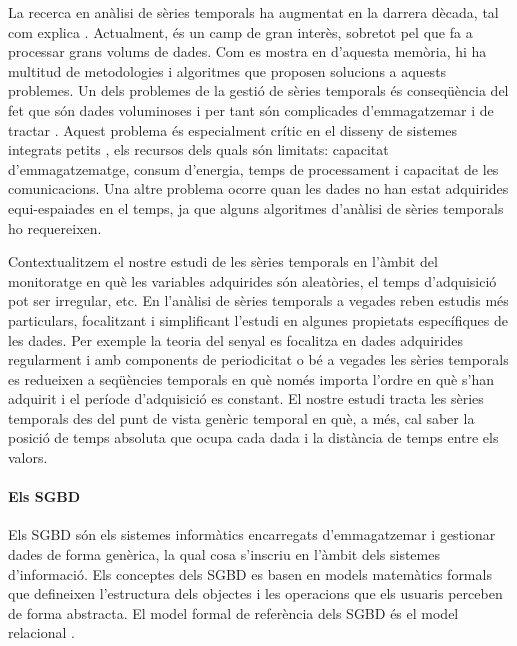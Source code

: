 La recerca en anàlisi de sèries temporals ha augmentat en la darrera
dècada, tal com explica \textcite{fu11}. Actualment, és un camp de
gran interès, sobretot pel que fa a processar grans volums de dades.
Com es mostra en  d'aquesta memòria, hi ha multitud
de metodologies i algoritmes que proposen solucions a aquests
problemes. Un dels problemes de la gestió de sèries temporals és
conseqüència del fet que són dades voluminoses i per tant són
complicades d'emmagatzemar i de tractar \cite{fu11,keogh08:isax}.
Aquest problema és especialment crític en el disseny de sistemes
integrats petits \cite{yaogehrke02}, els recursos dels quals són
limitats: capacitat d'emmagatzematge, consum d'energia, temps de
processament i capacitat de les comunicacions.  Una altre problema
ocorre quan les dades no han estat adquirides equi-espaiades en el
temps, ja que alguns algoritmes d'anàlisi de sèries temporals ho
requereixen.

Contextualitzem el nostre estudi de les sèries temporals en l'àmbit
del monitoratge en què les variables adquirides són aleatòries, el
temps d'adquisició pot ser irregular, etc.  En l'anàlisi de sèries
temporals a vegades reben estudis més particulars, focalitzant i
simplificant l'estudi en algunes propietats específiques de les
dades. Per exemple la teoria del senyal es focalitza en dades
adquirides regularment i amb components de periodicitat o bé a vegades
les sèries temporals es redueixen a seqüències temporals en què només
importa l'ordre en què s'han adquirit i el període d'adquisició es
constant. El nostre estudi tracta les sèries temporals des del punt de
vista genèric temporal en què, a més, cal saber la posició de temps
absoluta que ocupa cada dada i la distància de temps entre els valors.






\paragraph{Els SGBD}
Els \gls{SGBD} són els sistemes informàtics encarregats d'emmagatzemar
i gestionar dades de forma genèrica, la qual cosa s'inscriu en l'àmbit
dels sistemes d'informació. Els conceptes dels \gls{SGBD} es basen en
models matemàtics formals que defineixen l'estructura dels objectes i
les operacions que els usuaris perceben de forma abstracta. El model
formal de referència dels \gls{SGBD} és el model
relacional \parencite{date04:introduction8}.


